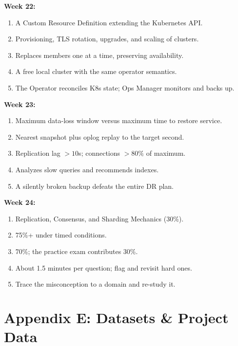 \documentclass[11pt, a4paper]{article}
\begin{document}
\textbf{Week 22:}
\begin{enumerate}[itemsep=0pt]
    \item A Custom Resource Definition extending the Kubernetes API.
    \item Provisioning, TLS rotation, upgrades, and scaling of clusters.
    \item Replaces members one at a time, preserving availability.
    \item A free local cluster with the same operator semantics.
    \item The Operator reconciles K8s state; Ops Manager monitors and backs up.
\end{enumerate}

\textbf{Week 23:}
\begin{enumerate}[itemsep=0pt]
    \item Maximum data-loss window versus maximum time to restore service.
    \item Nearest snapshot plus oplog replay to the target second.
    \item Replication lag $>10$s; connections $>80\%$ of maximum.
    \item Analyzes slow queries and recommends indexes.
    \item A silently broken backup defeats the entire DR plan.
\end{enumerate}

\textbf{Week 24:}
\begin{enumerate}[itemsep=0pt]
    \item Replication, Consensus, and Sharding Mechanics (30\%).
    \item 75\%+ under timed conditions.
    \item 70\%; the practice exam contributes 30\%.
    \item About 1.5 minutes per question; flag and revisit hard ones.
    \item Trace the misconception to a domain and re-study it.
\end{enumerate}

\section{Appendix E: Datasets \& Project Data}
\end{document}
